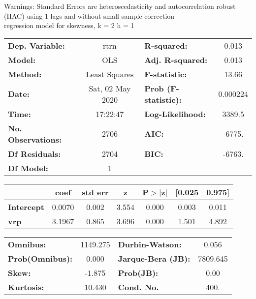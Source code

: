 Warnings: \newline
 [1] Standard Errors are heteroscedasticity and autocorrelation robust (HAC) using 1 lags and without small sample correction\\ 

regression model for skewness, k = 2 h = 1\begin{center}
\begin{tabular}{lclc}
\toprule
\textbf{Dep. Variable:}    &       rtrn       & \textbf{  R-squared:         } &     0.013   \\
\textbf{Model:}            &       OLS        & \textbf{  Adj. R-squared:    } &     0.013   \\
\textbf{Method:}           &  Least Squares   & \textbf{  F-statistic:       } &     13.66   \\
\textbf{Date:}             & Sat, 02 May 2020 & \textbf{  Prob (F-statistic):} &  0.000224   \\
\textbf{Time:}             &     17:22:47     & \textbf{  Log-Likelihood:    } &    3389.5   \\
\textbf{No. Observations:} &        2706      & \textbf{  AIC:               } &    -6775.   \\
\textbf{Df Residuals:}     &        2704      & \textbf{  BIC:               } &    -6763.   \\
\textbf{Df Model:}         &           1      & \textbf{                     } &             \\
\bottomrule
\end{tabular}
\begin{tabular}{lcccccc}
                   & \textbf{coef} & \textbf{std err} & \textbf{z} & \textbf{P$> |$z$|$} & \textbf{[0.025} & \textbf{0.975]}  \\
\midrule
\textbf{Intercept} &       0.0070  &        0.002     &     3.554  &         0.000        &        0.003    &        0.011     \\
\textbf{vrp}       &       3.1967  &        0.865     &     3.696  &         0.000        &        1.501    &        4.892     \\
\bottomrule
\end{tabular}
\begin{tabular}{lclc}
\textbf{Omnibus:}       & 1149.275 & \textbf{  Durbin-Watson:     } &    0.056  \\
\textbf{Prob(Omnibus):} &   0.000  & \textbf{  Jarque-Bera (JB):  } & 7809.645  \\
\textbf{Skew:}          &  -1.875  & \textbf{  Prob(JB):          } &     0.00  \\
\textbf{Kurtosis:}      &  10.430  & \textbf{  Cond. No.          } &     400.  \\
\bottomrule
\end{tabular}
\end{center}

